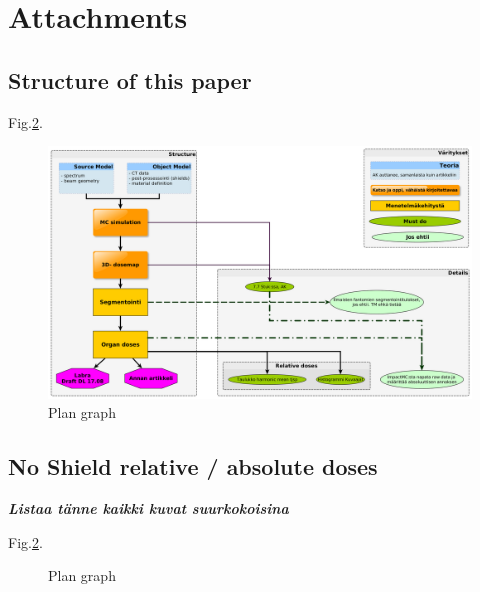 \documentclass[fleqn,10pt]{SelfArx} %
\begin{document}

\section*{Attachments}
\subsection*{Structure of this paper}
Fig.\ref{fig:TT_SyvLabraSofiev_Plan}.
\begin{figure}[ht]\centering
\includegraphics[width=\linewidth]{TT_SyvLabraSofiev_Plan}
\caption{Plan graph}
\label{fig:TT_SyvLabraSofiev_Plan}
\end{figure}

\subsection*{No Shield relative / absolute doses}
\textit{\textbf{Listaa tänne kaikki kuvat suurkokoisina}}

Fig.\ref{fig:TT_SyvLabraSofiev_Plan}.
\begin{figure}[ht]\centering

\caption{Plan graph}
\label{fig:TT_SyvLabraSofiev_Plan}
\end{figure}






\end{document}
